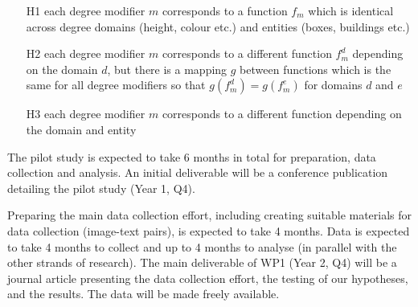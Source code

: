 \documentclass[11pt,a4paper]{article}
\begin{document}

\begin{itemize}
\item[H1] each degree modifier $m$ corresponds to a function $f_m$ which is identical across degree domains (height, colour etc.) and entities (boxes, buildings etc.)%
\item[H2] each degree modifier $m$ corresponds to a  different function $f_m^d$ depending on the  domain  $d$, but there is a mapping $g$ between functions which is the same for all degree modifiers so that $g(f_m^d)=g(f_m^e)$ for domains $d$ and $e$ 
\item[H3] each degree modifier $m$ corresponds to a  different function depending on the  domain and entity %
\end{itemize}



The pilot study is expected to take 6 months in total for preparation, data collection and analysis. An initial deliverable will be a conference publication detailing the pilot study (Year 1, Q4).

Preparing the main data collection effort, including creating suitable materials for data collection (image-text pairs),  is expected to take 4 months. Data is expected to take 4 months to collect and up to 4 months to analyse (in parallel with the other strands of research). The main deliverable of WP1 (Year 2, Q4) will be a journal article presenting the data collection effort, the testing of our hypotheses, and the results. The data will be made freely available. %
\end{document}
